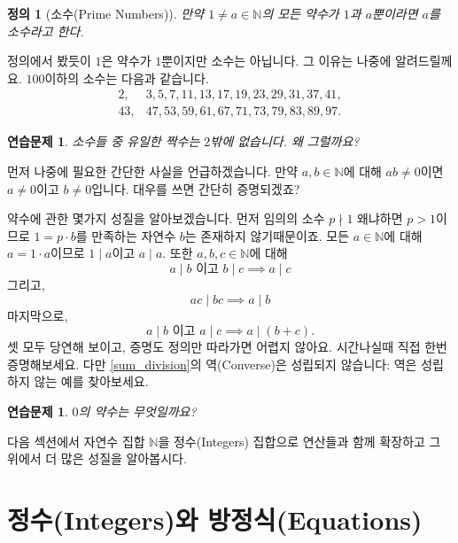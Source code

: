 \documentclass[a4paper, 11pt]{report}
\renewcommand{\<}{\langle}
\renewcommand{\>}{\rangle}
\newtheorem{dfn}[thm]{정의}
\newtheorem{exercise}[thm]{연습문제}
\begin{document}
\begin{dfn}[소수(Prime Numbers)]
  만약 $1 \neq a \in \mathbb{N}$의 모든 약수가 $1$과 $a$뿐이라면 $a$를 소수라고 한다.
\end{dfn}

정의에서 봤듯이 $1$은 약수가 $1$뿐이지만 소수는 아닙니다. 그 이유는 나중에 알려드릴께요. $100$이하의 소수는 
다음과 같습니다.
\begin{align*}
2,& 3, 5, 7, 11, 13, 17, 19, 23, 29, 31, 37, 41,\\ 
43,& 47, 53, 59, 61, 67, 71, 73, 79, 83, 89, 97.
\end{align*}

\begin{exercise}
  소수들 중 유일한 짝수는 $2$밖에 없습니다. 왜 그럴까요? 
\end{exercise}

먼저 나중에 필요한 간단한 사실을 언급하겠습니다. 만약 $a, b \in \mathbb{N}$에 대해 $ab \neq 0$이면 $a \neq 0$이고 
$b \neq 0$입니다. 대우를 쓰면 간단히 증명되겠죠? 

약수에 관한 몇가지 성질을 알아보겠습니다. 먼저 임의의 소수 $p \nmid 1$ 왜냐하면 $p > 1$이므로 
$1 = p\cdot b$를 만족하는 자연수 $b$는 존재하지 않기때문이죠. 모든 $a \in \mathbb{N}$에
대해 $a = 1\cdot a$이므로 $1 \mid a$이고 $a \mid a$. 또한 $a, b, c \in \mathbb{N}$에 대해
\begin{equation}\label{chain_division}
a \mid b \text{ 이고 } b \mid c \implies a \mid c
\end{equation}
그리고,
\begin{equation}\label{cancellation_division}
ac \mid bc \implies a \mid b
\end{equation}
마지막으로,
\begin{equation}\label{sum_division}
a \mid b \text{ 이고 } a \mid c \implies a \mid (b+c).
\end{equation}
셋 모두 당연해 보이고, 증명도 정의만 따라가면 어렵지 않아요. 시간나실때 직접 한번 증명해보세요. 
다만 \eqref{sum_division}의 역(Converse)은 성립되지 않습니다: 역은 성립하지 않는 예를 찾아보세요. 

\begin{exercise}
  $0$의 약수는 무엇일까요? 
\end{exercise}

다음 섹션에서 자연수 집합 $\mathbb{N}$을 정수(Integers) 집합으로 연산들과 함께 확장하고 그 위에서
더 많은 성질을 알아봅시다.

\section{정수(Integers)와 방정식(Equations)}
\end{document}
